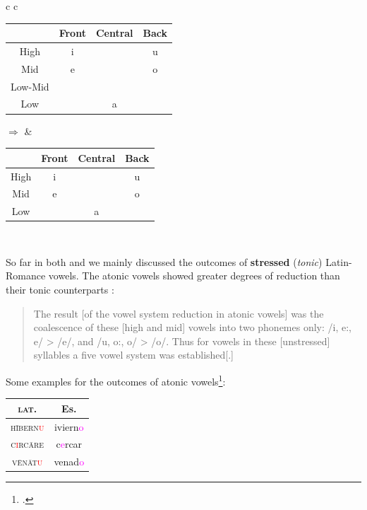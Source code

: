\documentclass{report}[12pt]
\begin{document}
\begin{tcolorbox}
  \begin{tabular}{c c}
    \begin{tabular}{|c|c|c|c|}
      \hline
      & Front & Central & Back \\
      \hline
      High & i & & u \\
      \hline
      Mid & e & & o \\
      \hline
      Low-Mid & \cellcolor{gray} \textipa{E} & & \cellcolor{gray} \textipa{O} \\
      \hline
      Low & & a & \\
      \hline
    \end{tabular} \quad $\Rightarrow$ & 
    \begin{tabular}{|c|c|c|c|}
      \hline
      & Front & Central & Back \\
      \hline
      High & i & & u \\
      \hline
      Mid & \cellcolor{magenta} e & & \cellcolor{magenta} o \\
      \hline
      Low & & a & \\
      \hline
    \end{tabular} \\
  \end{tabular} 
\end{tcolorbox}

So far in both  and  we mainly discussed the outcomes of \textbf{stressed} (\emph{tonic}) Latin-Romance vowels. The atonic vowels showed greater degrees of reduction than their tonic counterparts \parencite[p.~113]{lloyd_spanish}:
\begin{quote}
  The result [of the vowel system reduction in atonic vowels] was the coalescence of these [high and mid] vowels into two phonemes only: /i, e:, e/ > /e/, and /u, o:, o/ > /o/. Thus for vowels in these [unstressed] syllables a five vowel system was established[.] 
\end{quote}
Some examples for the outcomes of atonic vowels\footcite[p.~113]{lloyd_spanish}:
\begin{center}
  \begin{tabular}{c c}
    \textsc{lat.} & Es. \\
    \hline
    \textsc{h\={i}bern\textcolor{red}{u}} & iviern\textcolor{magenta}{o} \\
    \textsc{c\textcolor{red}{i}rc\={a}re} & c\textcolor{magenta}{e}rcar \\
    \textsc{v\={e}n\={a}t\textcolor{red}{u}} & venad\textcolor{magenta}{o} \\
  \end{tabular}
\end{center}
\end{document}
